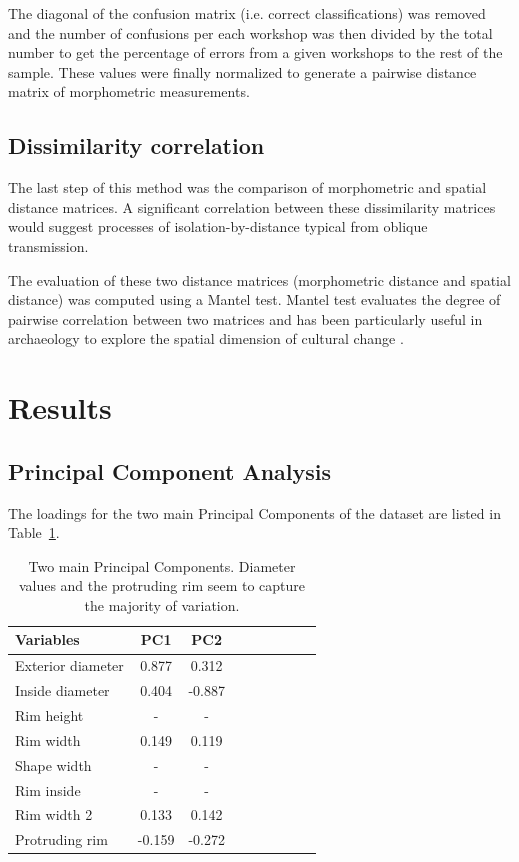 \documentclass[review]{elsarticle}
\begin{document}
The diagonal of the confusion matrix (i.e. correct classifications) was removed and the number of confusions per each workshop was then divided by the total number to get the percentage of errors from a given workshops to the rest of the sample. These values were finally normalized to generate a pairwise distance matrix of morphometric measurements.

\subsection{Dissimilarity correlation}

The last step of this method was the comparison of morphometric and spatial distance matrices. A significant correlation between these dissimilarity matrices would suggest processes of isolation-by-distance typical from oblique transmission.

The evaluation of these two distance matrices (morphometric distance and spatial distance) was computed using a Mantel test. Mantel test evaluates the degree of pairwise correlation between two matrices and has been particularly useful in archaeology to explore the spatial dimension of cultural change \citep{mantel_detection_1967, diniz-filho_mantel_2013, crema_culture_2014}.  

\section{Results}

\subsection{Principal Component Analysis}

The loadings for the two main Principal Components of the dataset are listed in Table~\ref{table:pca}.

\begin{table}[htp]
\centering
\begin{tabular}{lcccccccc}
\hline
Variables & PC1 & PC2 \\ \hline
Exterior diameter & 0.877 & 0.312 \\
Inside diameter & 0.404 & -0.887 \\
Rim height & - & - \\
Rim width & 0.149 & 0.119 \\
Shape width & - & - \\
Rim inside & - & - \\
Rim width 2 & 0.133 & 0.142 \\
Protruding rim & -0.159 & -0.272 \\
\hline
\end{tabular}
\caption{Two main Principal Components. Diameter values and the protruding rim seem to capture the majority of variation.}
\label{table:pca}
\end{table}
\end{document}
